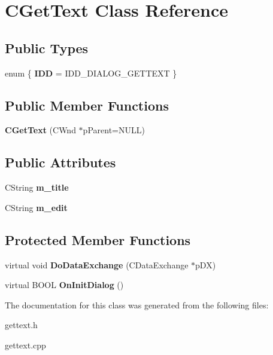 \hypertarget{class_c_get_text}{\section{C\-Get\-Text Class Reference}
\label{class_c_get_text}
}
\subsection*{Public Types}
\begin{DoxyCompactItemize}
\item 
enum \{ {\bfseries I\-D\-D} =  I\-D\-D\-\_\-\-D\-I\-A\-L\-O\-G\-\_\-\-G\-E\-T\-T\-E\-X\-T
 \}
\end{DoxyCompactItemize}
\subsection*{Public Member Functions}
\begin{DoxyCompactItemize}
\item 
\hypertarget{class_c_get_text_ae1e14da2b8b4727a09d9c231320bdabe}{{\bfseries C\-Get\-Text} (C\-Wnd $\ast$p\-Parent=N\-U\-L\-L)}\label{class_c_get_text_ae1e14da2b8b4727a09d9c231320bdabe}

\end{DoxyCompactItemize}
\subsection*{Public Attributes}
\begin{DoxyCompactItemize}
\item 
\hypertarget{class_c_get_text_a8425550801fa25ea508e7b1b6314c49b}{C\-String {\bfseries m\-\_\-title}}\label{class_c_get_text_a8425550801fa25ea508e7b1b6314c49b}

\item 
\hypertarget{class_c_get_text_a60b10820b90bd5206718d5c3fd32bbd5}{C\-String {\bfseries m\-\_\-edit}}\label{class_c_get_text_a60b10820b90bd5206718d5c3fd32bbd5}

\end{DoxyCompactItemize}
\subsection*{Protected Member Functions}
\begin{DoxyCompactItemize}
\item 
\hypertarget{class_c_get_text_a0ec4a72ee79cd91e9d236d5c36ba1897}{virtual void {\bfseries Do\-Data\-Exchange} (C\-Data\-Exchange $\ast$p\-D\-X)}\label{class_c_get_text_a0ec4a72ee79cd91e9d236d5c36ba1897}

\item 
\hypertarget{class_c_get_text_adc124de265d3f13b78e7d4a26dce4a49}{virtual B\-O\-O\-L {\bfseries On\-Init\-Dialog} ()}\label{class_c_get_text_adc124de265d3f13b78e7d4a26dce4a49}

\end{DoxyCompactItemize}


The documentation for this class was generated from the following files\-:\begin{DoxyCompactItemize}
\item 
gettext.\-h\item 
gettext.\-cpp\end{DoxyCompactItemize}
